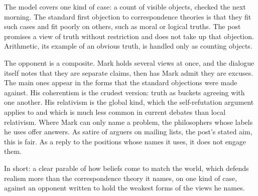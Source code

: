 \begin{afterword}
The model covers one kind of case: a count of visible objects, checked the next morning. The standard first objection to correspondence theories is that they fit such cases and fit poorly on others, such as moral or logical truths. The post promises a view of truth without restriction and does not take up that objection. Arithmetic, its example of an obvious truth, is handled only as counting objects.

The opponent is a composite. Mark holds several views at once, and the dialogue itself notes that they are separate claims, then has Mark admit they are excuses. The main ones appear in the forms that the standard objections were made against. His coherentism is the crudest version: truth as buckets agreeing with one another. His relativism is the global kind, which the self-refutation argument applies to and which is much less common in current debates than local relativism. Where Mark can only name a problem, the philosophers whose labels he uses offer answers. As satire of arguers on mailing lists, the post's stated aim, this is fair. As a reply to the positions whose names it uses, it does not engage them.

In short: a clear parable of how beliefs come to match the world, which defends realism more than the correspondence theory it names, on one kind of case, against an opponent written to hold the weakest forms of the views he names.
\end{afterword}
